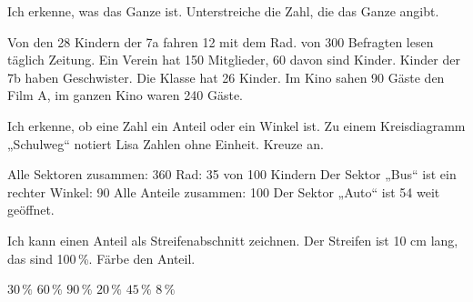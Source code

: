 \setcounter{aufgabe}{11}

\begin{aufgabe}{Ich erkenne, was das Ganze ist.}
Unterstreiche die Zahl, die das Ganze angibt.
\begin{teile}
\teil Von den 28 Kindern der 7a fahren 12 mit dem Rad.
 von 300 Befragten lesen täglich Zeitung.
\teil Ein Verein hat 150 Mitglieder, 60 davon sind Kinder.
 Kinder der 7b haben Geschwister. Die Klasse hat 26 Kinder.
\teil Im Kino sahen 90 Gäste den Film A, im ganzen Kino waren 240 Gäste.
\end{teile}
\end{aufgabe}

\begin{aufgabe}{Ich erkenne, ob eine Zahl ein Anteil oder ein Winkel ist.}
Zu einem Kreisdiagramm „Schulweg“ notiert Lisa Zahlen ohne Einheit. Kreuze an.
\begin{teile}
\teil Alle Sektoren zusammen: 360 \hfill {}\quad{}
\teil Rad: 35 von 100 Kindern \hfill {}\quad{}
\teil Der Sektor „Bus“ ist ein rechter Winkel: 90 \hfill {}\quad{}
\teil Alle Anteile zusammen: 100 \hfill {}\quad{}
\teil Der Sektor „Auto“ ist 54 weit geöffnet. \hfill {}\quad{}
\end{teile}
\end{aufgabe}

\begin{aufgabe}{Ich kann einen Anteil als Streifenabschnitt zeichnen.}
Der Streifen ist 10 cm lang, das sind 100\,\%. Färbe den Anteil.
\begin{teile}
\teil $30\,\%$ \quad {}
\teil $60\,\%$ \quad {}
\teil $90\,\%$ \quad {}
\teil $20\,\%$ \quad {}
\teil $45\,\%$ \quad {}
\teil $8\,\%$ \quad {}
\end{teile}
\end{aufgabe}

